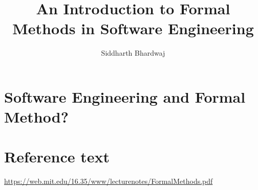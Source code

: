 \documentclass{article}
\title{An Introduction to Formal Methods in Software Engineering}
\author{Siddharth Bhardwaj}
\begin{document}
    \maketitle
    \newpage

    \section{Software Engineering and Formal Method?}

    \section{Reference text}
    \href{https://web.mit.edu/16.35/www/lecturenotes/FormalMethods.pdf}{https://web.mit.edu/16.35/www/lecturenotes/FormalMethods.pdf}
\end{document}
